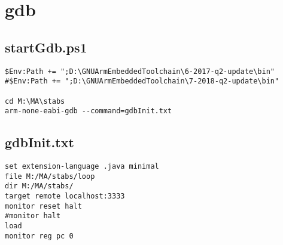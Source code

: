 \section{gdb}
\subsection{startGdb.ps1}
\label{anhang:startGdb.ps1}
\lstset{language=sh}
\begin{lstlisting}
$Env:Path += ";D:\GNUArmEmbeddedToolchain\6-2017-q2-update\bin"
#$Env:Path += ";D:\GNUArmEmbeddedToolchain\7-2018-q2-update\bin"

cd M:\MA\stabs
arm-none-eabi-gdb --command=gdbInit.txt
\end{lstlisting}


\subsection{gdbInit.txt}
\label{anhang:gdbInit.txt}
\lstset{language=plain}
\begin{lstlisting}
set extension-language .java minimal
file M:/MA/stabs/loop
dir M:/MA/stabs/
target remote localhost:3333
monitor reset halt
#monitor halt
load
monitor reg pc 0
\end{lstlisting}
